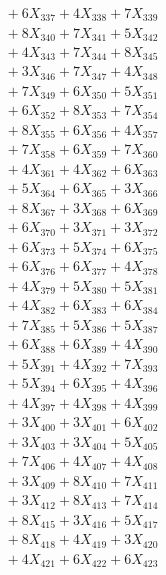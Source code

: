 \documentclass[a4paper,10pt]{article}
\begin{document}
{\begin{align}
&\;  + 6 X_{337} + 4 X_{338} + 7 X_{339} \\[0.5ex]\allowbreak
&\;  + 8 X_{340} + 7 X_{341} + 5 X_{342} \\[0.3ex]
&\;  + 4 X_{343} + 7 X_{344} + 8 X_{345} \\[0.3ex]
&\;  + 3 X_{346} + 7 X_{347} + 4 X_{348} \\[0.3ex]
&\;  + 7 X_{349} + 6 X_{350} + 5 X_{351} \\[0.3ex]
&\;  + 6 X_{352} + 8 X_{353} + 7 X_{354} \\[0.3ex]
&\;  + 8 X_{355} + 6 X_{356} + 4 X_{357} \\[0.3ex]
&\;  + 7 X_{358} + 6 X_{359} + 7 X_{360} \\[0.3ex]
&\;  + 4 X_{361} + 4 X_{362} + 6 X_{363} \\[0.3ex]
&\;  + 5 X_{364} + 6 X_{365} + 3 X_{366} \\[0.3ex]
&\;  + 8 X_{367} + 3 X_{368} + 6 X_{369} \\[0.5ex]\allowbreak
&\;  + 6 X_{370} + 3 X_{371} + 3 X_{372} \\[0.3ex]
&\;  + 6 X_{373} + 5 X_{374} + 6 X_{375} \\[0.3ex]
&\;  + 6 X_{376} + 6 X_{377} + 4 X_{378} \\[0.3ex]
&\;  + 4 X_{379} + 5 X_{380} + 5 X_{381} \\[0.3ex]
&\;  + 4 X_{382} + 6 X_{383} + 6 X_{384} \\[0.3ex]
&\;  + 7 X_{385} + 5 X_{386} + 5 X_{387} \\[0.3ex]
&\;  + 6 X_{388} + 6 X_{389} + 4 X_{390} \\[0.3ex]
&\;  + 5 X_{391} + 4 X_{392} + 7 X_{393} \\[0.3ex]
&\;  + 5 X_{394} + 6 X_{395} + 4 X_{396} \\[0.3ex]
&\;  + 4 X_{397} + 4 X_{398} + 4 X_{399} \\[0.5ex]\allowbreak
&\;  + 3 X_{400} + 3 X_{401} + 6 X_{402} \\[0.3ex]
&\;  + 3 X_{403} + 3 X_{404} + 5 X_{405} \\[0.3ex]
&\;  + 7 X_{406} + 4 X_{407} + 4 X_{408} \\[0.3ex]
&\;  + 3 X_{409} + 8 X_{410} + 7 X_{411} \\[0.3ex]
&\;  + 3 X_{412} + 8 X_{413} + 7 X_{414} \\[0.3ex]
&\;  + 8 X_{415} + 3 X_{416} + 5 X_{417} \\[0.3ex]
&\;  + 8 X_{418} + 4 X_{419} + 3 X_{420} \\[0.3ex]
&\;  + 4 X_{421} + 6 X_{422} + 6 X_{423} \\[0.3ex]

\end{align}}
\end{document}
